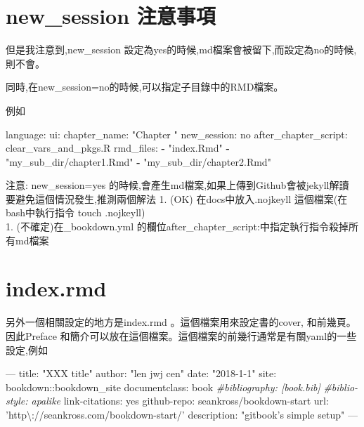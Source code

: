 \documentclass[]{book}
\newenvironment{Shaded}{\begin{snugshade}}{\end{snugshade}}
\newcommand{\AttributeTok}[1]{\textcolor[rgb]{0.77,0.63,0.00}{#1}}
\newcommand{\CommentTok}[1]{\textcolor[rgb]{0.56,0.35,0.01}{\textit{#1}}}
\newcommand{\FunctionTok}[1]{\textcolor[rgb]{0.00,0.00,0.00}{#1}}
\newcommand{\KeywordTok}[1]{\textcolor[rgb]{0.13,0.29,0.53}{\textbf{#1}}}
\newcommand{\OtherTok}[1]{\textcolor[rgb]{0.56,0.35,0.01}{#1}}
\newcommand{\StringTok}[1]{\textcolor[rgb]{0.31,0.60,0.02}{#1}}
\theoremstyle{definition}
\theoremstyle{definition}
\theoremstyle{definition}
\theoremstyle{remark}
\begin{document}
\hypertarget{new_session-}{%
\section{new\_session 注意事項}\label{new_session-}}

但是我注意到,new\_session
設定為yes的時候,md檔案會被留下,而設定為no的時候,則不會。

同時,在new\_session=no的時候,可以指定子目錄中的RMD檔案。

例如

\begin{Shaded}
\begin{Highlighting}[]
\FunctionTok{language:}
  \FunctionTok{ui:}
    \FunctionTok{chapter_name:}\AttributeTok{ }\StringTok{"Chapter "}
\FunctionTok{new_session:}\AttributeTok{ no}
\FunctionTok{after_chapter_script:}\AttributeTok{ clear_vars_and_pkgs.R}
\FunctionTok{rmd_files:}
  \KeywordTok{-} \StringTok{"index.Rmd"}
  \KeywordTok{-} \StringTok{"my_sub_dir/chapter1.Rmd"}
  \KeywordTok{-} \StringTok{"my_sub_dir/chapter2.Rmd"}
\end{Highlighting}
\end{Shaded}

注意: new\_session=yes
的時候,會產生md檔案,如果上傳到Github會被jekyll解讀
要避免這個情況發生,推測兩個解法 1. (OK) 在docs中放入.nojkeyll
這個檔案(在bash中執行指令 touch .nojkeyll)\\
1. (不確定)在\_bookdown.yml
的欄位after\_chapter\_script:中指定執行指令殺掉所有md檔案

\hypertarget{index.rmd-1}{%
\section{index.rmd}\label{index.rmd-1}}

另外一個相關設定的地方是index.rmd 。這個檔案用來設定書的cover,
和前幾頁。因此Preface
和簡介可以放在這個檔案。這個檔案的前幾行通常是有關yaml的一些設定,例如

\begin{Shaded}
\begin{Highlighting}[]
\OtherTok{---}
\FunctionTok{title:}\AttributeTok{ }\StringTok{"XXX title"}
\FunctionTok{author:}\AttributeTok{ }\StringTok{"len jwj cen"}
\FunctionTok{date:}\AttributeTok{ }\StringTok{"2018-1-1"}
\FunctionTok{site:}\AttributeTok{ bookdown::bookdown_site}
\FunctionTok{documentclass:}\AttributeTok{ book}
\CommentTok{#bibliography: [book.bib]}
\CommentTok{#biblio-style: apalike}
\FunctionTok{link-citations:}\AttributeTok{ yes}
\FunctionTok{github-repo:}\AttributeTok{ seankross/bookdown-start}
\FunctionTok{url:}\AttributeTok{ }\StringTok{'http\textbackslash{}://seankross.com/bookdown-start/'}
\FunctionTok{description:}\AttributeTok{ }\StringTok{"gitbook's simple setup"}
\OtherTok{---}
\end{Highlighting}
\end{Shaded}
\end{document}
